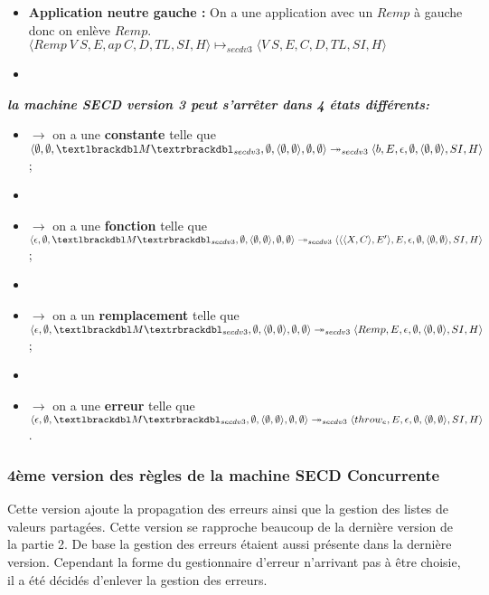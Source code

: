 \documentclass[10pt,a4paper]{article}
\begin{document}
\begin{itemize}
\begin{itemize}
						\item[] \textbf{Application neutre gauche :} On a une application avec un $Remp$ à gauche donc on enlève $Remp$.
						\smallbreak
						$\langle Remp~V~S,E,ap~C,D,TL,SI,H\rangle \longmapsto_{secdv3} \langle V~S,E,C,D,TL,SI,H\rangle$
						\item[]
					\end{itemize}
				\end{itemize}
				\bigbreak
				\bigbreak
				
				\textbf{\textit{la machine SECD version 3 peut s'arrêter dans 4 états différents:}}
				\smallbreak
				\begin{itemize}
					\item[]$\longrightarrow$ on a une \textbf{constante} telle que $\langle \emptyset,\emptyset,\textlbrackdbl M\textrbrackdbl_{secdv3},\emptyset,\langle\emptyset,\emptyset\rangle,\emptyset,\emptyset\rangle \twoheadrightarrow_{secdv3} \langle b,E,\epsilon,\emptyset,\langle\emptyset,\emptyset\rangle,SI,H\rangle$;
					\item[]
					\item[]$\longrightarrow$ on a une \textbf{fonction} telle que $\langle \epsilon,\emptyset,\textlbrackdbl M\textrbrackdbl_{secdv3},\emptyset,\langle\emptyset,\emptyset\rangle,\emptyset,\emptyset\rangle \twoheadrightarrow_{secdv3} \langle\langle\langle X,C\rangle,E'\rangle,E,\epsilon,\emptyset,\langle\emptyset,\emptyset\rangle,SI,H\rangle$;
					\item[]
					\item[]$\longrightarrow$ on a un \textbf{remplacement} telle que $\langle \epsilon,\emptyset,\textlbrackdbl M\textrbrackdbl_{secdv3},\emptyset,\langle\emptyset,\emptyset\rangle,\emptyset,\emptyset\rangle \twoheadrightarrow_{secdv3} \langle Remp,E,\epsilon,\emptyset,\langle\emptyset,\emptyset\rangle,SI,H\rangle$;
					\item[]
					\item[]$\longrightarrow$ on a une \textbf{erreur} telle que $\langle \epsilon,\emptyset,\textlbrackdbl M\textrbrackdbl_{secdv3},\emptyset,\langle\emptyset,\emptyset\rangle,\emptyset,\emptyset\rangle \twoheadrightarrow_{secdv3} \langle throw_{e},E,\epsilon,\emptyset,\langle\emptyset,\emptyset\rangle,SI,H\rangle$.
				\end{itemize}
				\newpage
				
				
				
			\subsubsection{4ème version des règles de la machine SECD Concurrente}
				Cette version ajoute la propagation des erreurs ainsi que la gestion des listes de valeurs partagées. Cette version se rapproche beaucoup de la dernière version de la partie 2. De base la gestion des erreurs étaient aussi présente dans la dernière version. Cependant la forme du gestionnaire d'erreur n'arrivant pas à être choisie, il a été décidés d'enlever la gestion des erreurs.
				\bigbreak
				
\end{document}
